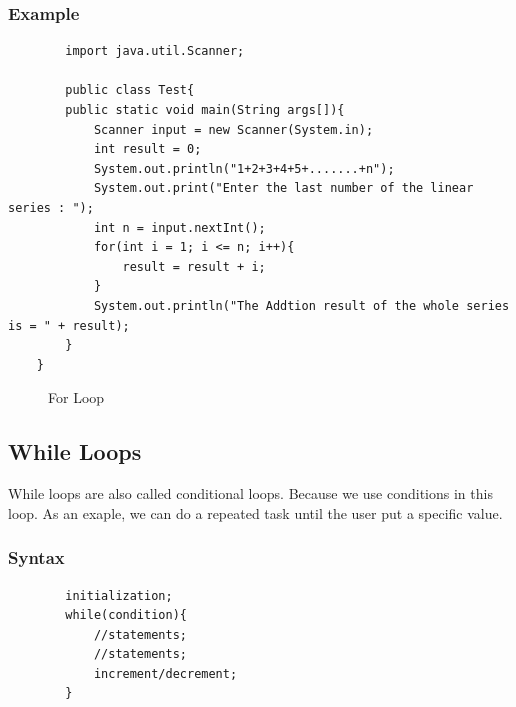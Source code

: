 \documentclass[openany]{book}  %
\begin{document}
\subsubsection{Example}
\begin{center}
    \footnotesize
    \begin{verbatim}
        import java.util.Scanner;

        public class Test{
        public static void main(String args[]){
            Scanner input = new Scanner(System.in);
            int result = 0;
            System.out.println("1+2+3+4+5+.......+n");
            System.out.print("Enter the last number of the linear series : ");
            int n = input.nextInt();
            for(int i = 1; i <= n; i++){
                result = result + i;
            }
            System.out.println("The Addtion result of the whole series is = " + result);
        }
    }
    \end{verbatim}
\end{center}
% 
% 
\begin{figure}[htbp]
    \begin{center}
        \caption{For Loop}
    \end{center}
\end{figure}
% 
% 
\subsection{While Loops}
While loops are also called conditional loops. Because we use conditions in this loop. As an exaple, we can do a repeated task until the user put a specific value.
% 
% 
\subsubsection{Syntax}
\begin{center}
    \begin{verbatim}
        initialization;
        while(condition){
            //statements;
            //statements;
            increment/decrement;
        }
    \end{verbatim}
\end{center}
% 
% 
\end{document}
